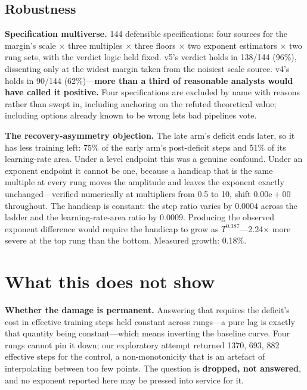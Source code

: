 \documentclass[11pt]{article}
\begin{document}
\subsection{Robustness}

\textbf{Specification multiverse.} 144 defensible specifications: four sources for
the margin's scale $\times$ three multiples $\times$ three floors $\times$ two
exponent estimators $\times$ two rung sets, with the verdict logic held fixed.
v5's verdict holds in 138/144 (96\%), dissenting only at the widest margin taken
from the noisiest scale source. v4's holds in 90/144 (62\%)---\textbf{more than a
third of reasonable analysts would have called it positive.} Four specifications
are excluded by name with reasons rather than swept in, including anchoring on the
refuted theoretical value; including options already known to be wrong lets bad
pipelines vote.

\textbf{The recovery-asymmetry objection.} The late arm's deficit ends later, so
it has less training left: 75\% of the early arm's post-deficit steps and 51\% of
its learning-rate area. Under a level endpoint this was a genuine confound. Under
an exponent endpoint it cannot be one, because a handicap that is the same
multiple at every rung moves the amplitude and leaves the exponent exactly
unchanged---verified numerically at multipliers from 0.5 to 10, shift
$0.00\mathrm{e}{+}00$ throughout. The handicap is constant: the step ratio varies
by $0.0004$ across the ladder and the learning-rate-area ratio by $0.0009$.
Producing the observed exponent difference would require the handicap to grow as
$T^{0.387}$---2.24$\times$ more severe at the top rung than the bottom. Measured
growth: 0.18\%.

\section{What this does not show}
\label{sec:notshow}

\textbf{Whether the damage is permanent.} Answering that requires the deficit's
cost in effective training steps held constant across rungs---a pure lag is
exactly that quantity being constant---which means inverting the baseline curve.
Four rungs cannot pin it down; our exploratory attempt returned 1370, 693, 882
effective steps for the control, a non-monotonicity that is an artefact of
interpolating between too few points. The question is \textbf{dropped, not
answered}, and no exponent reported here may be pressed into service for it.
\end{document}
